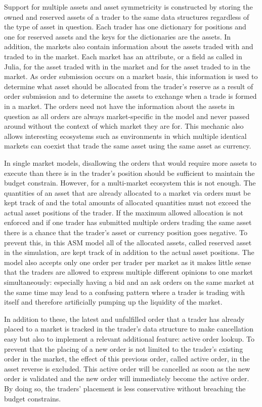 Support for multiple assets and asset symmetricity is constructed by storing 
the owned and reserved assets of a trader to the same data structures regardless
of the type of asset in question. Each trader has one dictionary for positions 
and one for reserved assets and the keys for the dictionaries are the assets. 
In addition, the markets also contain information about the assets traded with and traded to 
in the market. Each market has an attribute, or a field as called
in Julia, for the asset traded with in the market and for the asset
traded to in the market. As order submission occurs on a market basis, this information
is used to determine what asset should be allocated from the trader's reserve as a result of 
order submission and to determine the assets to exchange when a trade is formed in a market. 
The orders need not have the information about the assets in question as all orders are always
market-specific in the model and never passed around without the context of which market they are 
for. This mechanic also allows interesting ecosystems such as environments
in which multiple identical markets can coexist that trade the same asset using the same asset as
currency. 

In single market models, disallowing the orders that would require more assets to execute
than there is in the trader's position should be sufficient to maintain the budget constrain. 
However, for a multi-market ecosystem this is not enough. The quantities of an asset 
that are already allocated to a market via orders must be kept track of and the total amounts of 
allocated quantities must not exceed the actual asset positions of the trader. If the maximum allowed 
allocation is not enforced and if one trader has submitted multiple orders trading the same asset
there is a chance that the trader's asset or currency position goes negative. 
To prevent this, in this ASM model all of the allocated assets, called reserved asset 
in the simulation, are kept track of in addition to the actual asset positions. The model also
accepts only one order per trader per market as it makes little sense that
the traders are allowed to express multiple different opinions to one market 
simultaneously: especially having a bid and an ask orders on the same market
at the same time may lead to a confusing pattern where a trader is trading with
itself and therefore artificially pumping up the liquidity of the market. 

In addition to these, the latest and unfulfilled order that a trader has already placed
to a market is tracked in the trader's data structure to make cancellation easy
but also to implement a relevant additional feature: active order lookup. To prevent that
the placing of a new order is not limited to the trader's existing order in the market,
the effect of this previous order, called active order, in the asset reverse is excluded. 
This active order will be cancelled as soon as the new order is validated and the new order
will immediately become the active order. By doing so, the traders' placement is less 
conservative without breaching the budget constrains.


